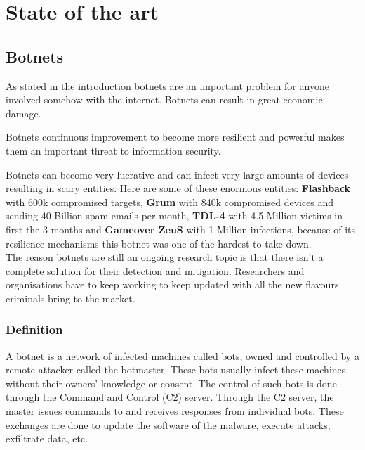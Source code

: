 
\chapter{State of the art}

\label{State of the art}

\section{Botnets}
As stated in the introduction botnets are an important problem for anyone involved somehow with the internet. Botnets can result in great economic damage. 

Botnets continuous improvement to become more resilient and powerful makes them an important threat to information security.

Botnets can become very lucrative and can infect very large amounts of devices resulting in scary entities.
Here are some of these enormous entities: \textbf{Flashback} with 600k compromised targets, \textbf{Grum} with 840k compromised devices and sending 40 Billion spam emails per month, \textbf{TDL-4} with 4.5 Million victims in first the 3 months and \textbf{Gameover ZeuS} with 1 Million infections, because of its resilience mechanisms this botnet was one of the hardest to take down.\\

The reason botnets are still an ongoing research topic is that there isn't a complete solution for their detection and mitigation. Researchers and organisations have to keep working to keep updated with all the new flavours criminals bring to the market.
\subsection{Definition}

A botnet is a network of infected machines called bots, owned and controlled by a remote attacker called the botmaster. These bots usually infect these machines without their owners' knowledge or consent\cite{Botnet1}. The control of such bots is done through the Command and Control (C2) server. Through the C2 server, the master issues commands to and receives responses from individual bots. These exchanges are done to update the software of the malware, execute attacks, exfiltrate data, etc.


